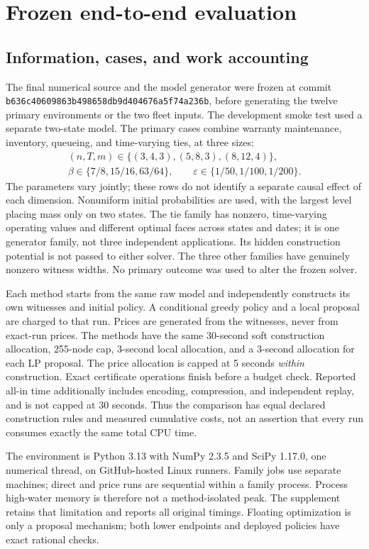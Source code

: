 \section{Frozen end-to-end evaluation}\label{sec:evidence48}
\subsection{Information, cases, and work accounting}
The final numerical source and the model generator were frozen at commit \texttt{b636c40609863b498658db9d404676a5f74a236b}, before generating the twelve primary environments or the two fleet inputs. The development smoke test used a separate two-state model. The primary cases combine warranty maintenance, inventory, queueing, and time-varying ties, at three sizes:
\begin{gather*}
(n,T,m)\in\{(3,4,3),(5,8,3),(8,12,4)\},\\
\beta\in\{7/8,15/16,63/64\},\qquad\varepsilon\in\{1/50,1/100,1/200\}.
\end{gather*}
The parameters vary jointly; these rows do not identify a separate causal effect of each dimension. Nonuniform initial probabilities are used, with the largest level placing mass only on two states. The tie family has nonzero, time-varying operating values and different optimal faces across states and dates; it is one generator family, not three independent applications. Its hidden construction potential is not passed to either solver. The three other families have genuinely nonzero witness widths. No primary outcome was used to alter the frozen solver.

Each method starts from the same raw model and independently constructs its own witnesses and initial policy. A conditional greedy policy and a local proposal are charged to that run. Prices are generated from the witnesses, never from exact-run prices. The methods have the same 30-second soft construction allocation, 255-node cap, 3-second local allocation, and a 3-second allocation for each LP proposal. The price allocation is capped at 5 seconds \emph{within} construction. Exact certificate operations finish before a budget check. Reported all-in time additionally includes encoding, compression, and independent replay, and is not capped at 30 seconds. Thus the comparison has equal declared construction rules and measured cumulative costs, not an assertion that every run consumes exactly the same total CPU time.

The environment is Python 3.13 with NumPy 2.3.5 and SciPy 1.17.0, one numerical thread, on GitHub-hosted Linux runners. Family jobs use separate machines; direct and price runs are sequential within a family process. Process high-water memory is therefore not a method-isolated peak. The supplement retains that limitation and reports all original timings. Floating optimization is only a proposal mechanism; both lower endpoints and deployed policies have exact rational checks.

